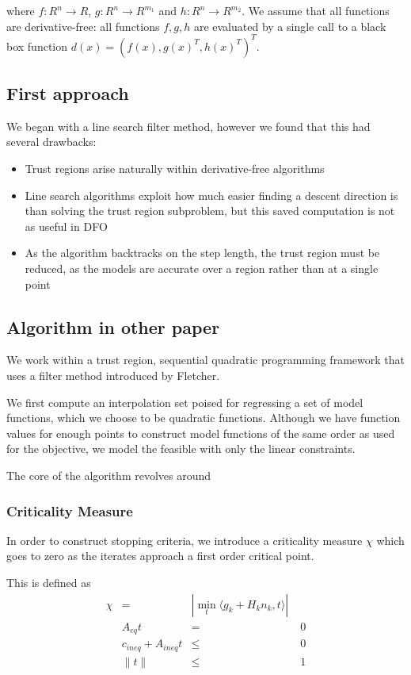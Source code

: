 \documentclass{article}
\begin{document}
where $f : R^n \to R$, $g : R^{n} \to R^{m_1}$ and $h : R^{n} \to R^{m_2}$.
We assume that all functions are derivative-free: all functions $f,g,h$ are evaluated by a single call to a black box function $d(x) = (f(x), g(x)^T, h(x)^T)^T$.



\subsection{First approach}
We began with a line search filter method, however we found that this had several drawbacks:

\begin{itemize}
\item Trust regions arise naturally within derivative-free algorithms
\item Line search algorithms exploit how much easier finding a descent direction is than solving the trust region subproblem, but this saved computation is not as useful in DFO
\item As the algorithm backtracks on the step length, the trust region must be reduced, as the models are accurate over a region rather than at a single point
\end{itemize}

\subsection{Algorithm in other paper}

We work within a trust region, sequential quadratic programming framework that uses a filter method introduced by Fletcher.

We first compute an interpolation set poised for regressing a set of model functions, which we choose to be quadratic functions.
Although we have function values for enough points to construct model functions of the same order as used for the objective, we model the feasible with only the linear constraints.

The core of the algorithm revolves around

\subsubsection{Criticality Measure}
In order to construct stopping criteria, we introduce a criticality measure $\chi$ which goes to zero as the iterates approach a first order critical point.

This is defined as
\begin{align*}
\chi & = & |\min_t \langle g_k + H_kn_k, t\rangle| \\
& A_{eq}t &=& \; 0 \\
& c_{ineq} + A_{ineq}t &\le& \; 0 \\
& \| t \| &\le& \; 1
\end{align*}
\end{document}
